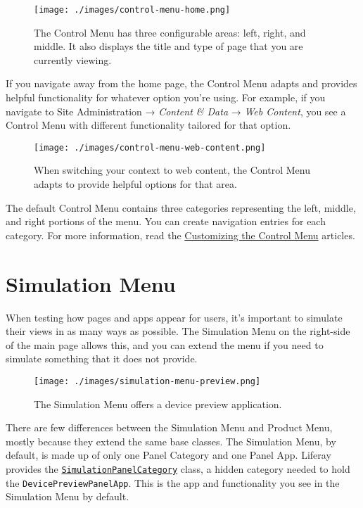 \begin{figure}
\centering
\texttt{[image: ./images/control-menu-home.png]}
\caption{The Control Menu has three configurable areas: left, right, and
middle. It also displays the title and type of page that you are
currently viewing.}
\end{figure}

If you navigate away from the home page, the Control Menu adapts and
provides helpful functionality for whatever option you're using. For
example, if you navigate to Site Administration → \emph{Content \& Data}
→ \emph{Web Content}, you see a Control Menu with different
functionality tailored for that option.

\begin{figure}
\centering
\texttt{[image: ./images/control-menu-web-content.png]}
\caption{When switching your context to web content, the Control Menu
adapts to provide helpful options for that area.}
\end{figure}

The default Control Menu contains three categories representing the
left, middle, and right portions of the menu. You can create navigation
entries for each category. For more information, read the
\href{/docs/7-2/customization/-/knowledge_base/c/customizing-the-control-menu}{Customizing
the Control Menu} articles.

\section{Simulation Menu}\label{simulation-menu}

When testing how pages and apps appear for users, it's important to
simulate their views in as many ways as possible. The Simulation Menu on
the right-side of the main page allows this, and you can extend the menu
if you need to simulate something that it does not provide.

\begin{figure}
\centering
\texttt{[image: ./images/simulation-menu-preview.png]}
\caption{The Simulation Menu offers a device preview application.}
\end{figure}

There are few differences between the Simulation Menu and Product Menu,
mostly because they extend the same base classes. The Simulation Menu,
by default, is made up of only one Panel Category and one Panel App.
Liferay provides the
\href{https://github.com/liferay/liferay-portal/blob/7.2.0-ga1/modules/apps/product-navigation/product-navigation-simulation-web/src/main/java/com/liferay/product/navigation/simulation/web/internal/application/list/SimulationPanelCategory.java}{\texttt{SimulationPanelCategory}}
class, a hidden category needed to hold the
\texttt{DevicePreviewPanelApp}. This is the app and functionality you
see in the Simulation Menu by default.


